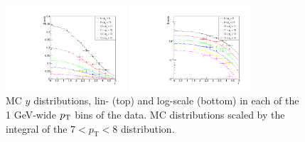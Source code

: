 \documentclass{article}
\begin{document}
\clearpage

\begin{figure}[h!]
\centering
\includegraphics[width = 0.4\textwidth]{plots/y_dist.pdf}

\includegraphics[width = 0.4\textwidth]{plots/y_dist_log.pdf}
\caption{MC $y$ distributions, lin- (top) and log-scale (bottom) in each of the 1 GeV-wide $p_\text T$ bins of the data. MC distributions scaled by the integral of the $7<p_\text{T}<8$ distribution.}\label{f:y_comp}
\end{figure}
\end{document}
